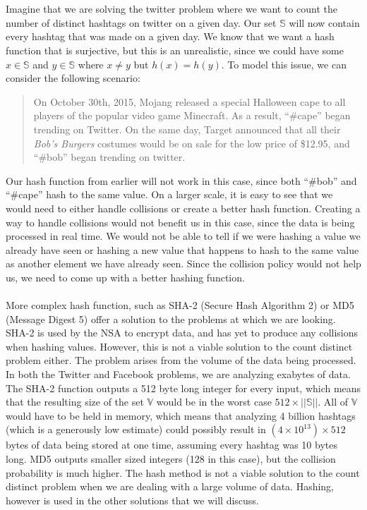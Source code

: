 \documentclass{article}
\begin{document}
\\\\
\indent Imagine that we are solving the twitter problem where we want to count the number of distinct hashtags on twitter on a given day. Our set $\mathbb{S}$ will now contain every hashtag that was made on a given day. We know that we want a hash function that is surjective, but this is an unrealistic, since we could have some $x \in \mathbb{S}$ and $y\in\mathbb{S}$ where $x \neq y$ but $h(x) = h(y)$. To model this issue, we can consider the following scenario:
\begin{quote}
On October 30th, 2015, Mojang released a special Halloween cape to all players of the popular video game Minecraft. As a result, ``\#cape'' began trending on Twitter. On the same day, Target announced that all their \textit{Bob's Burgers} costumes would be on sale for the low price of \$12.95, and ``\#bob'' began trending on twitter.
\end{quote}
Our hash function from earlier will not work in this case, since both ``\#bob'' and ``\#cape'' hash to the same value. On a larger scale, it is easy to see that we would need to either handle collisions or create a better hash function. Creating a way to handle collisions would not benefit us in this case, since the data is being processed in real time. We would not be able to tell if we were hashing a value we already have seen or hashing a new value that happens to hash to the same value as another element we have already seen. Since the collision policy would not help us, we need to come up with a better hashing function.
\\\\
\indent More complex hash function, such as SHA-2 (Secure Hash Algorithm 2) or MD5 (Message Digest 5) offer a solution to the problems at which we are looking. SHA-2 is used by the NSA to encrypt data, and has yet to produce any collisions when hashing values. However, this is not a viable solution to the count distinct problem either. The problem arises from the volume of the data being processed. In both the Twitter and Facebook problems, we are analyzing exabytes of data. The SHA-2 function outputs a 512 byte long integer for every input, which means that the resulting size of the set $\mathbb{V}$ would be in the worst case $512 \times ||\mathbb{S}||$. All of $\mathbb{V}$ would have to be held in memory, which means that analyzing 4 billion hashtags (which is a generously low estimate) could possibly result in $(4 \times 10^{13}) \times 512$ bytes of data being stored at one time, assuming every hashtag was 10 bytes long. MD5 outputs smaller sized integers (128 in this case), but the collision probability is much higher. The hash method is not a viable solution to the count distinct problem when we are dealing with a large volume of data. Hashing, however is used in the other solutions that we will discuss.
\end{document}
